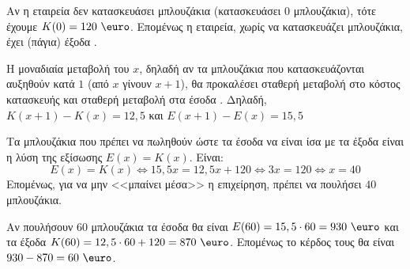 
\begin{alist}
\item Αν η εταιρεία δεν κατασκευάσει μπλουζάκια (κατασκευάσει $0$ μπλουζάκια), τότε έχουμε
$K(0) = \text{120 \euro}$. Επομένως η εταιρεία, χωρίς να κατασκευάζει μπλουζάκια, έχει (πάγια) έξοδα \text{120 \euro}.

\item Η μοναδιαία μεταβολή του $x$, δηλαδή αν τα μπλουζάκια που κατασκευάζονται αυξηθούν κατά $1$ (από $x$ γίνουν $x + 1$), θα προκαλέσει σταθερή μεταβολή  στο κόστος κατασκευής και σταθερή μεταβολή στα έσοδα . Δηλαδή,
$K(x + 1) - K(x) = 12,5$ και $E(x + 1) - E(x) = 15,5$

\item Τα μπλουζάκια που πρέπει να πωληθούν ώστε τα έσοδα να είναι ίσα με τα έξοδα είναι η λύση της εξίσωσης $E(x) = K(x)$. Είναι:
\[E(x) = K(x) \Leftrightarrow 15,5x = 12,5x + 120 \Leftrightarrow 3x = 120 \Leftrightarrow x = 40\]
Επομένως, για να μην <<μπαίνει μέσα>> η επιχείρηση, πρέπει να πουλήσει $40$ μπλουζάκια.

\item Αν πουλήσουν $60$ μπλουζάκια τα έσοδα θα είναι
$E(60) = 15,5 \cdot 60 = 930\text{ \euro}$
και τα έξοδα $K(60) = 12,5 \cdot 60 + 120 = 870\text{ \euro}$.
Επομένως το κέρδος τους θα είναι $930 - 870 = 60\text{ \euro}$.
\end{alist}

